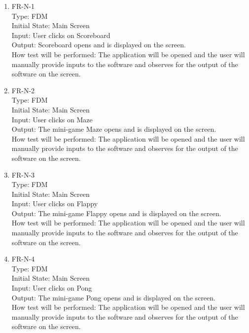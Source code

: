 \documentclass[12pt, titlepage]{article}
\begin{document}
\begin{enumerate}

\item{FR-N-1\\}
Type: FDM\\
Initial State: Main Screen\\
Input: User clicks on Scoreboard\\
Output: Scoreboard opens and is displayed on the screen.\\
How test will be performed: The application will be opened and the user will manually provide inputs to the software and observes for the output of the software on the screen.\\

\item{FR-N-2\\}
Type: FDM\\
Initial State: Main Screen\\
Input: User clicks on Maze\\
Output: The mini-game Maze opens and is displayed on the screen.\\
How test will be performed: The application will be opened and the user will manually provide inputs to the software and observes for the output of the software on the screen.\\

\item{FR-N-3\\}
Type: FDM\\
Initial State: Main Screen\\
Input: User clicks on Flappy\\
Output: The mini-game Flappy opens and is displayed on the screen.\\
How test will be performed: The application will be opened and the user will manually provide inputs to the software and observes for the output of the software on the screen.\\

\item{FR-N-4\\}
Type: FDM\\
Initial State: Main Screen\\
Input: User clicks on Pong\\
Output: The mini-game Pong opens and is displayed on the screen.\\
How test will be performed: The application will be opened and the user will manually provide inputs to the software and observes for the output of the software on the screen.\\


\end{enumerate}
\end{document}
